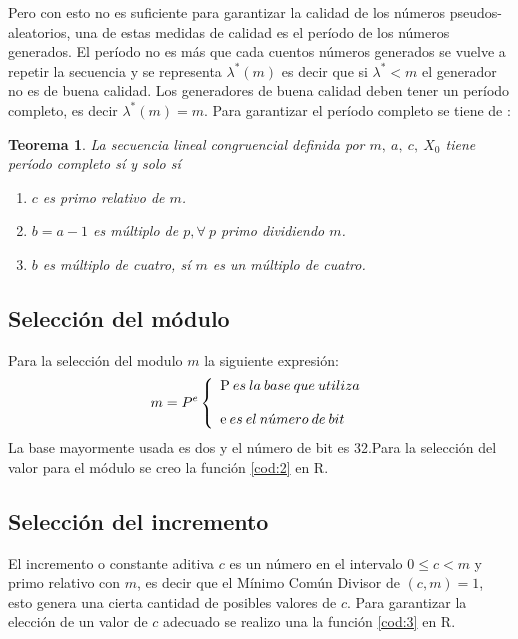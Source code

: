 \documentclass{article}
\newtheorem{teor}{Teorema}
\begin{document}
Pero con esto no es suficiente para garantizar la calidad de los números pseudos-aleatorios, una de estas medidas de calidad es el período de los números generados. El período no es más que cada cuentos números generados se vuelve a repetir la secuencia y se representa $\lambda^{*}(m)$ es decir que si $\lambda^{*}<m$ el generador no es de buena calidad. Los generadores de buena calidad deben tener un período completo, es decir $\lambda^{*}(m)=m$. Para garantizar el período completo se tiene de \cite{glc}:
\begin{teor}
La secuencia lineal congruencial definida por $m,\: a,\: c,\: X_{0}$ tiene período completo sí y solo sí
\begin{enumerate}
\item $c$ es primo relativo de $m$.
\item $b=a-1$ es múltiplo de $p, \forall\: p$ primo dividiendo $m$. 
\item $b$ es múltiplo de cuatro, sí $m$ es un múltiplo de cuatro.
\end{enumerate}
\end{teor}
\subsection{Selección del módulo}
Para la selección del modulo $m$ la siguiente expresión:
\begin{equation}
m = P^{e} \left\lbrace
\begin{array}{ll}
\textup{P}\: es \:la\: base \:que \:utiliza\\
\textup{}\\
\textup{e} \:es\: el\: n\acute{u}mero \:de \:bit
\end{array}
\right.
\end{equation}
La base mayormente usada es dos y el número de bit es 32.Para la selección del valor para el módulo se creo la función \ref{cod:2} en R.

\begin{center}

\label{cod:2}
\end{center}

\subsection{Selección del incremento}
El incremento o constante aditiva $c$ es un número en el intervalo $0\leq c<m$ y primo relativo con $m$, es decir que el Mínimo Común Divisor de $(c,m)= 1$, esto genera una cierta cantidad de posibles valores de $c$. Para garantizar la elección de un valor de $c$ adecuado se realizo una la función \ref{cod:3} en R. 
\end{document}

